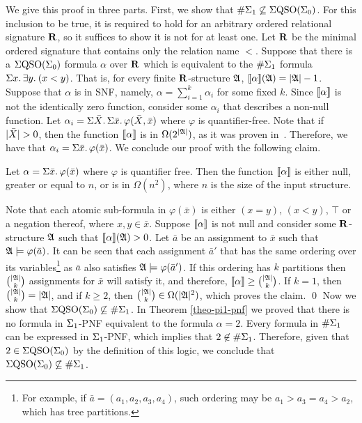 
We give this proof in three parts.
First, we show that $\#\Sigma_{1} \not\subseteq \Sigma{\rm QSO}(\Sigma_{0})$. 
For this inclusion to be true, it is required to hold for an arbitrary ordered relational signature $\mathbf{R}$, so it suffices to show it is not for at least one.
Let $\mathbf{R}$ be the minimal ordered signature that contains only the relation name $<$.
Suppose that there is a $\Sigma{\rm QSO}(\Sigma_{0})$ formula $\alpha$ over $\mathbf{R}$ which is equivalent to the $\#\Sigma_{1}$ formula $\Sigma{x}.\, \exists{y}.\: (x < y)$. 
That is, for every finite $\mathbf{R}$-structure $\mathfrak{A}$, ${\llbracket{}{\alpha}\rrbracket}(\mathfrak{A}) = \vert \mathfrak{A} \vert - 1$.
Suppose that $\alpha$ is in SNF, namely, $\alpha = \sum_{i = 1}^k \alpha_i$ for some fixed $k$. 
Since ${\llbracket{}{\alpha}\rrbracket}$ is not the identically zero function, consider some $\alpha_i$ that describes a non-null function. 
Let $\alpha_i = \Sigma{\bar{X}}.\,\Sigma{\bar{x}}.\,\varphi(\bar{X},\bar{x})$ where $\varphi$ is quantifier-free. 
Note that if $\vert \bar{X} \vert > 0$, then the function ${\llbracket{}{\alpha}\rrbracket}$ is in $\Omega(2^{\vert \mathfrak{A} \vert})$, as it was proven in~\cite{SalujaST95}. 
Therefore, we have that $\alpha_i = \Sigma{\bar{x}}.\,\varphi(\bar{x})$. 
We conclude our proof with the following claim.
\begin{clm}
	Let $\alpha = \Sigma{\bar{x}}.\,\varphi(\bar{x})$	where $\varphi$ is quantifier free. 
	Then the function ${\llbracket{}{\alpha}\rrbracket}$ is either null, greater or equal to $n$, or is in $\Omega(n^2)$, where $n$ is the size of the input structure.
\end{clm}
\proof
	Note that each atomic sub-formula in $\varphi(\bar{x})$ is either $(x = y)$, $(x < y)$, $\top$ or a negation thereof, where $x,y\in\bar{x}$. 
	Suppose ${\llbracket{}{\alpha}\rrbracket}$ is not null and consider some $\mathbf{R}$-structure $\mathfrak{A}$ such that ${\llbracket{}{\alpha}\rrbracket}(\mathfrak{A}) > 0$. 
	Let $\bar{a}$ be an assignment to $\bar{x}$ such that $\mathfrak{A}\models\varphi(\bar{a})$. 
	It can be seen that each assignment $\bar{a}'$ that has the same ordering over its variables\footnote{For example, if $\bar{a} = (a_1,a_2,a_3,a_4)$, such ordering may be $a_1 > a_3 = a_4 > a_2$, which has tree partitions.}	as $\bar{a}$ also satisfies $\mathfrak{A}\models\varphi(\bar{a}')$. 
	If this ordering has $k$ partitions then $\binom{\vert \mathfrak{A} \vert}{k}$ assignments for $\bar{x}$ will satisfy it, and therefore, ${\llbracket{}{\alpha}\rrbracket} \geq \binom{\vert \mathfrak{A} \vert}{k}$. 
	If $k = 1$, then $\binom{\vert \mathfrak{A} \vert}{k} = \vert \mathfrak{A} \vert$, and if $k \geq 2$, then $\binom{\vert \mathfrak{A} \vert}{k} \in \Omega(\vert \mathfrak{A} \vert^2)$, which proves the claim.
\qed
{}
Now we show that $\Sigma{\rm QSO}(\Sigma_{0}) \not\subseteq \#\Sigma_{1}$. 
In Theorem \ref{theo-pi1-pnf} we proved that there is no formula in $\Sigma_{1}$-PNF equivalent to the formula $\alpha = 2$. 
Every formula in $\#\Sigma_{1}$ can be expressed in $\Sigma_{1}$-PNF, which implies that $2 \not\in \#\Sigma_{1}$. Therefore, given that $2 \in \Sigma{\rm QSO}(\Sigma_{0})$ by the definition of this logic, we conclude that $\Sigma{\rm QSO}(\Sigma_{0}) \not\subseteq \#\Sigma_{1}$.


